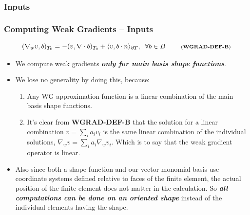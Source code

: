 \documentclass[compress]{beamer}
\begin{document}
\subsubsection{Inputs}
 
\begin{frame}
  \frametitle{Computing Weak Gradients -- Inputs}
  \begin{equation*}
    (\nabla_w v, b)_{T_0} = -(v, \nabla \cdot b)_{T_0} + \langle v, b \cdot n \rangle_{\partial T}, \;\; \forall b \in B 
    \;\quad\quad \text{\scriptsize (\textbf{WGRAD-DEF-B})}
  \end{equation*}
  \pause
  \begin{itemize}[<+->]
    \item  We compute weak gradients \emph{\textbf{only for main basis shape functions}}.
    \item We lose no generality by doing this, because:
      \begin{enumerate}[<+->]
        \item Any WG approximation function is a linear combination of the main basis shape functions.
        \item It's clear from {\scriptsize \textbf{WGRAD-DEF-B}} that the solution for a linear combination $v = \sum_i a_i v_i$
          is the same linear combination of the individual solutions, $\nabla_w v = \sum_i a_i \nabla_w v_i$.
          Which is to say that the weak gradient operator is linear.
      \end{enumerate}
    \item Also since both a shape function and our vector monomial basis use coordinate systems defined relative to faces of the finite
      element, the actual position of the finite element does not matter in the calculation.
      So \emph{\textbf{all computations can be done on an oriented shape}} instead of the individual elements having the shape.
  \end{itemize}
\end{frame}
\end{document}
